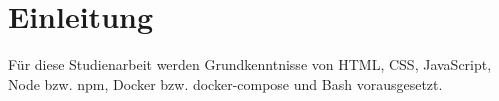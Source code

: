 \chapter{Einleitung}

Für diese Studienarbeit werden Grundkenntnisse von HTML, CSS, JavaScript, Node bzw. npm, Docker bzw. docker-compose und Bash vorausgesetzt.
